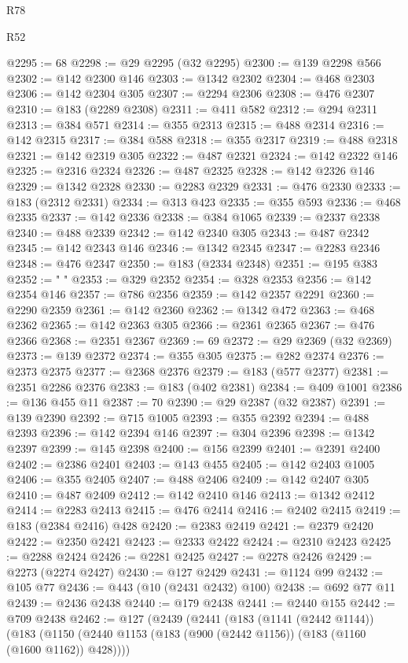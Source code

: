 \begin{lexlean}{R78}
\begin{lexlean}{R52}
\begin{coremodule}
{{{{{{{{{{{{{{{{{{{{{{{{{{{{{{{{{{{{{{{{{{{{{{{{{{{{{{{{{{{{{{{{{{{{{{{{{{{{{{{{{{{{{{{{{{{{{{{{{{{{{{{{{{{{{{{{{{{{{{{{{{{{{{{{{{{{{{{{{{{{{{{{{{{{{{{{{{{{{{{{{{{{{{{{{{{{{{{{{{{{{{{{{{{{{{{{{{{{{{@2295 := 68
@2298 := @29 @2295 (@32 @2295)
@2300 := @139 @2298 @566
@2302 := @142 @2300 @146
@2303 := @1342 @2302
@2304 := @468 @2303
@2306 := @142 @2304 @305
@2307 := @2294 @2306
@2308 := @476 @2307
@2310 := @183 (@2289 @2308)
@2311 := @411 @582
@2312 := @294 @2311
@2313 := @384 @571
@2314 := @355 @2313
@2315 := @488 @2314
@2316 := @142 @2315
@2317 := @384 @588
@2318 := @355 @2317
@2319 := @488 @2318
@2321 := @142 @2319 @305
@2322 := @487 @2321
@2324 := @142 @2322 @146
@2325 := @2316 @2324
@2326 := @487 @2325
@2328 := @142 @2326 @146
@2329 := @1342 @2328
@2330 := @2283 @2329
@2331 := @476 @2330
@2333 := @183 (@2312 @2331)
@2334 := @313 @423
@2335 := @355 @593
@2336 := @468 @2335
@2337 := @142 @2336
@2338 := @384 @1065
@2339 := @2337 @2338
@2340 := @488 @2339
@2342 := @142 @2340 @305
@2343 := @487 @2342
@2345 := @142 @2343 @146
@2346 := @1342 @2345
@2347 := @2283 @2346
@2348 := @476 @2347
@2350 := @183 (@2334 @2348)
@2351 := @195 @383
@2352 := " "
@2353 := @329 @2352
@2354 := @328 @2353
@2356 := @142 @2354 @146
@2357 := @786 @2356
@2359 := @142 @2357 @2291
@2360 := @2290 @2359
@2361 := @142 @2360
@2362 := @1342 @472
@2363 := @468 @2362
@2365 := @142 @2363 @305
@2366 := @2361 @2365
@2367 := @476 @2366
@2368 := @2351 @2367
@2369 := 69
@2372 := @29 @2369 (@32 @2369)
@2373 := @139 @2372
@2374 := @355 @305
@2375 := @282 @2374
@2376 := @2373 @2375
@2377 := @2368 @2376
@2379 := @183 (@577 @2377)
@2381 := @2351 @2286 @2376
@2383 := @183 (@402 @2381)
@2384 := @409 @1001
@2386 := @136 @455 @11
@2387 := 70
@2390 := @29 @2387 (@32 @2387)
@2391 := @139 @2390
@2392 := @715 @1005
@2393 := @355 @2392
@2394 := @488 @2393
@2396 := @142 @2394 @146
@2397 := @304 @2396
@2398 := @1342 @2397
@2399 := @145 @2398
@2400 := @156 @2399
@2401 := @2391 @2400
@2402 := @2386 @2401
@2403 := @143 @455
@2405 := @142 @2403 @1005
@2406 := @355 @2405
@2407 := @488 @2406
@2409 := @142 @2407 @305
@2410 := @487 @2409
@2412 := @142 @2410 @146
@2413 := @1342 @2412
@2414 := @2283 @2413
@2415 := @476 @2414
@2416 := @2402 @2415
@2419 := @183 (@2384 @2416) @428
@2420 := @2383 @2419
@2421 := @2379 @2420
@2422 := @2350 @2421
@2423 := @2333 @2422
@2424 := @2310 @2423
@2425 := @2288 @2424
@2426 := @2281 @2425
@2427 := @2278 @2426
@2429 := @2273 (@2274 @2427)
@2430 := @127 @2429
@2431 := @1124 @99
@2432 := @105 @77
@2436 := @443 (@10 (@2431 @2432) @100)
@2438 := @692 @77 @11
@2439 := @2436 @2438
@2440 := @179 @2438
@2441 := @2440 @155
@2442 := @709 @2438
@2462 := @127
    (@2439
      (@2441
        (@183
          (@1141 (@2442 @1144))
          (@183
            (@1150 (@2440 @1153 (@183 (@900 (@2442 @1156)) (@183 (@1160 (@1600 @1162)) @428))))
}}}}}}}}}}}}}}}}}}}}}}}}}}}}}}}}}}}}}}}}}}}}}}}}}}}}}}}}}}}}}}}}}}}}}}}}}}}}}}}}}}}}}}}}}}}}}}}}}}}}}}}}}}}}}}}}}}}}}}}}}}}}}}}}}}}}}}}}}}}}}}}}}}}}}}}}}}}}}}}}}}}}}}}}}}}}}}}}}}}}}}}}}}}}}}}}}}}}}}
\end{coremodule}
\end{lexlean}
\end{lexlean}
